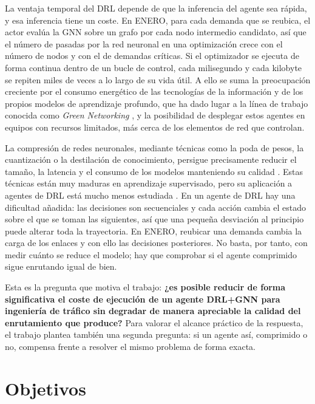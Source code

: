 La ventaja temporal del DRL depende de que la inferencia del agente sea rápida, y esa inferencia tiene un coste. En ENERO, para cada demanda que se reubica, el actor evalúa la GNN sobre un grafo por cada nodo intermedio candidato, así que el número de pasadas por la red neuronal en una optimización crece con el número de nodos y con el de demandas críticas. Si el optimizador se ejecuta de forma continua dentro de un bucle de control, cada milisegundo y cada kilobyte se repiten miles de veces a lo largo de su vida útil. A ello se suma la preocupación creciente por el consumo energético de las tecnologías de la información y de los propios modelos de aprendizaje profundo, que ha dado lugar a la línea de trabajo conocida como \textit{Green Networking} \cite{bianzino2012survey,du2020green}, y la posibilidad de desplegar estos agentes en equipos con recursos limitados, más cerca de los elementos de red que controlan.

La compresión de redes neuronales, mediante técnicas como la poda de pesos, la cuantización o la destilación de conocimiento, persigue precisamente reducir el tamaño, la latencia y el consumo de los modelos manteniendo su calidad \cite{han2016deep,jacob2018quantization,hinton2015distilling}. Estas técnicas están muy maduras en aprendizaje supervisado, pero su aplicación a agentes de DRL está mucho menos estudiada \cite{ivanov2025neural}. En un agente de DRL hay una dificultad añadida: las decisiones son secuenciales y cada acción cambia el estado sobre el que se toman las siguientes, así que una pequeña desviación al principio puede alterar toda la trayectoria. En ENERO, reubicar una demanda cambia la carga de los enlaces y con ello las decisiones posteriores. No basta, por tanto, con medir cuánto se reduce el modelo; hay que comprobar si el agente comprimido sigue enrutando igual de bien.

Esta es la pregunta que motiva el trabajo: \textbf{¿es posible reducir de forma significativa el coste de ejecución de un agente DRL+GNN para ingeniería de tráfico sin degradar de manera apreciable la calidad del enrutamiento que produce?} Para valorar el alcance práctico de la respuesta, el trabajo plantea también una segunda pregunta: si un agente así, comprimido o no, compensa frente a resolver el mismo problema de forma exacta.

\section{Objetivos}\label{sec:int_objetivos}

